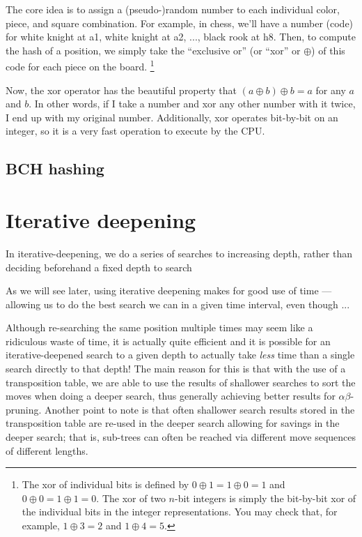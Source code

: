 \documentclass[10pt,dvipdfmx]{report}
\newcommand{\ab}{{$\alpha\beta$}}
\begin{document}
The core idea is to assign a (pseudo-)random number to each individual color, piece, and square
combination.  For example, in chess, we'll have a number (code) for white knight at a1, white knight at a2,
..., black rook at h8.  Then, to compute the hash of a position, we simply take the ``exclusive or''
(or ``xor'' or $\oplus$) of this code for each piece on the board.
\footnote{
  The xor of individual bits is defined by $0\oplus1=1\oplus0=1$ and $0\oplus0=1\oplus1=0$.
  The xor of two $n$-bit integers is simply the bit-by-bit xor of the individual bits in the
  integer representations.  You may check that, for example, $1\oplus3=2$ and $1\oplus4=5$.
}

Now, the xor operator has the beautiful property that $(a\oplus b)\oplus b = a$ for any $a$ and $b$.
In other words, if I take a number and xor any other number with it twice, I end up with my original number.
Additionally, xor operates bit-by-bit on an integer, so it is a very fast operation to execute by the CPU.

\subsection{BCH hashing}

\section{Iterative deepening}

In iterative-deepening, we do a series of searches to increasing depth, rather than
deciding beforehand a fixed depth to search

As we will see later, using iterative deepening makes for good use of
time --- allowing us to do the best search we can in a given time interval,
even though ...

Although re-searching the same position multiple times may seem like a ridiculous waste
of time, it is actually quite efficient and it is possible for an iterative-deepened search to
a given depth to actually take {\em less} time than a single search directly to that depth!
The main reason for this is that with the use of a transposition table, we are able to use
the results of shallower searches to sort the moves when doing a deeper search, thus generally
achieving better results for \ab-pruning.  Another point to note is that often shallower search results
stored in the transposition table are re-used in the deeper search allowing for savings in the
deeper search; that is, sub-trees can often be reached via different move sequences of different lengths.
\end{document}

